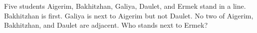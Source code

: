 Five students Aigerim, Bakhitzhan, Galiya, Daulet, and Ermek stand in a line. Bakhitzhan is first. Galiya is next to Aigerim but not Daulet. No two of Aigerim, Bakhitzhan, and Daulet are adjacent. Who stands next to Ermek?
